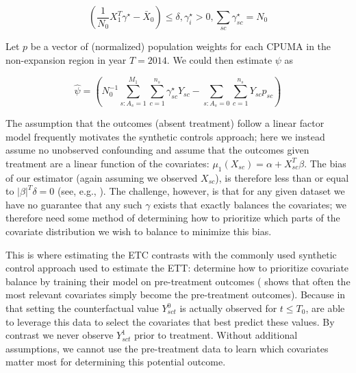 \documentclass{article}
\begin{document}
$$
(\frac{1}{N_0}X_1^T\gamma^\star - \bar{X}_0) \le \delta, \gamma_i^\star > 0, \sum_{sc} \gamma_{sc}^\star = N_0
$$

Let $p$ be a vector of (normalized) population weights for each CPUMA in the non-expansion region in year $T = 2014$. We could then estimate $\psi$ as

$$
\hat{\psi} = (N_0^{-1}\sum_{s: A_s = 1}^{M_1}\sum_{c = 1}^{n_s}\gamma_{sc}^\star Y_{sc} - \sum_{s: A_s = 0}\sum_{c = 1}^{n_s}Y_{sc}p_{sc})
$$

The assumption that the outcomes (absent treatment) follow a linear factor model frequently motivates the synthetic controls approach; here we instead assume no unobserved confounding and assume that the outcomes given treatment are a linear function of the covariates: $\mu_1(X_{sc}) = \alpha + X_{sc}^T\beta$. The bias of our estimator (again assuming we observed $X_{sc}$), is therefore less than or equal to $\lvert\beta\rvert^T\delta = 0$ (see, e.g., \cite{zubizarreta2015stable}). The challenge, however, is that for any given dataset we have no guarantee that any such $\gamma$ exists that exactly balances the covariates; we therefore need some method of determining how to prioritize which parts of the covariate distribution we wish to balance to minimize this bias.

This is where estimating the ETC contrasts with the commonly used synthetic control approach used to estimate the ETT: \cite{abadie2010synthetic} determine how to prioritize covariate balance by training their model on pre-treatment outcomes (\cite{kaul2015synthetic} shows that often the most relevant covariates simply become the pre-treatment outcomes). Because in that setting the counterfactual value $Y^0_{sct}$ is actually observed for $t \le T_0$, \cite{abadie2010synthetic} are able to leverage this data to select the covariates that best predict these values. By contrast we never observe $Y^1_{sct}$ prior to treatment. Without additional assumptions, we cannot use the pre-treatment data to learn which covariates matter most for determining this potential outcome.
\end{document}
